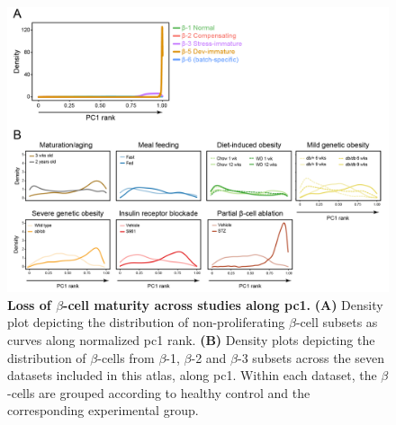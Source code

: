 \begin{figure}[H]
\vspace{-17pt}
\centering
\includegraphics[width=\linewidth]{Appendix2/Fig/F3-7-02.png}
\caption[Loss of $\beta$-cell maturity across studies along 1]{\textbf{Loss of $\beta$-cell maturity across studies along \gls{pc}1.} \textbf{(A)} Density plot depicting the distribution of non-proliferating $\beta$-cell subsets as curves along normalized \gls{pc}1 rank. \textbf{(B)} Density plots depicting the distribution of $\beta$-cells from $\beta$-1, $\beta$-2 and $\beta$-3 subsets across the seven datasets included in this atlas, along \gls{pc}1. Within each dataset, the $\beta$-cells are grouped according to healthy control and the corresponding experimental group.}
\label{fig:app_chp3_pc1}
\end{figure}


